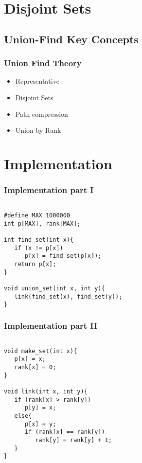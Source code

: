 \documentclass{beamer}
\begin{document}
\section{Disjoint Sets}
\subsection{Union-Find Key Concepts}
\begin{frame}
\frametitle{Union Find Theory}
\begin{itemize}
	\item Representative
	\item Disjoint Sets
	\item Path compression
	\item Union by Rank
\end{itemize}
\end{frame}
\section{Implementation}
\begin{frame}[fragile]
\frametitle{ Implementation part I }
\begin{example}[ C++ Implementation ]
\begin{lstlisting}

#define MAX 1000000
int p[MAX], rank[MAX];

int find_set(int x){
   if (x != p[x])
      p[x] = find_set(p[x]);
   return p[x];
}

void union_set(int x, int y){
   link(find_set(x), find_set(y));
}
\end{lstlisting}
\end{example}
\end{frame}

\begin{frame}[fragile]
\frametitle{ Implementation part II }
\begin{example}[ C++ Implementation ]
\begin{lstlisting}

void make_set(int x){
   p[x] = x;
   rank[x] = 0;
}

void link(int x, int y){
   if (rank[x] > rank[y])
      p[y] = x;
   else{
      p[x] = y;
      if (rank[x] == rank[y])
         rank[y] = rank[y] + 1;
   }
}
\end{lstlisting}
\end{example}
\end{frame}
\end{document}
